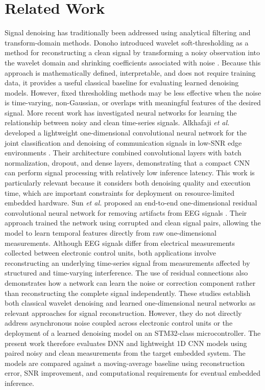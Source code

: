 \documentclass[conference]{IEEEtran}
\begin{document}
\section{Related Work}
Signal denoising has traditionally been addressed using analytical filtering and transform-domain methods. Donoho introduced wavelet soft-thresholding as a method for reconstructing a clean signal by transforming a noisy observation into the wavelet domain and shrinking coefficients associated with noise \cite{b1}. Because this approach is mathematically defined, interpretable, and does not require training data, it provides a useful classical baseline for evaluating learned denoising models. However, fixed thresholding methods may be less effective when the noise is time-varying, non-Gaussian, or overlaps with meaningful features of the desired signal. More recent work has investigated neural networks for learning the relationship between noisy and clean time-series signals. Alkhafaji \textit{et al.} developed a lightweight one-dimensional convolutional neural network for the joint classification and denoising of communication signals in low-SNR edge environments \cite{b2}. Their architecture combined convolutional layers with batch normalization, dropout, and dense layers, demonstrating that a compact CNN can perform signal processing with relatively low inference latency. This work is particularly relevant because it considers both denoising quality and execution time, which are important constraints for deployment on resource-limited embedded hardware. Sun \textit{et al.} proposed an end-to-end one-dimensional residual convolutional neural network for removing artifacts from EEG signals \cite{b3}. Their approach trained the network using corrupted and clean signal pairs, allowing the model to learn temporal features directly from raw one-dimensional measurements. Although EEG signals differ from electrical measurements collected between electronic control units, both applications involve reconstructing an underlying time-series signal from measurements affected by structured and time-varying interference. The use of residual connections also demonstrates how a network can learn the noise or correction component rather than reconstructing the complete signal independently. These studies establish both classical wavelet denoising and learned one-dimensional neural networks as relevant approaches for signal reconstruction. However, they do not directly address asynchronous noise coupled across electronic control units or the deployment of a learned denoising model on an STM32-class microcontroller. The present work therefore evaluates DNN and lightweight 1D CNN models using paired noisy and clean measurements from the target embedded system. The models are compared against a moving-average baseline using reconstruction error, SNR improvement, and computational requirements for eventual embedded inference.  
\end{document}
